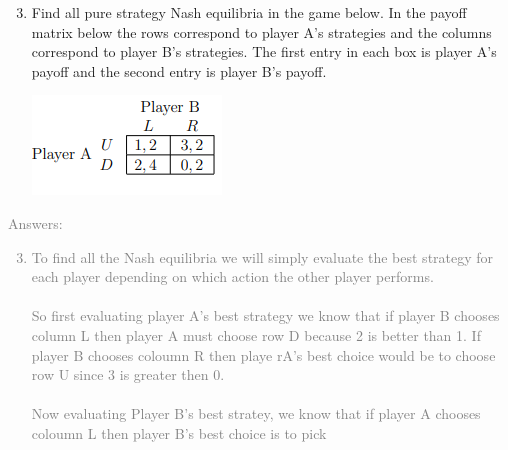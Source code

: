 \documentclass[11pt]{article}
\begin{document}
\begin{enumerate}
	\setcounter{enumi}{2}
	\item Find all pure strategy Nash equilibria in the game below. In the payoff matrix below the rows correspond to player A’s strategies and the columns correspond to player B’s strategies. The first entry in each box is player A’s payoff and the second entry is player B’s payoff.
	\begin{center}
		\includegraphics[scale=1.0]{Figure1.1}
	\end{center}
\end{enumerate}
\textcolor{gray}{
Answers:
\begin{enumerate}
	\setcounter{enumi}{2}
	\item To find all the Nash equilibria we will simply evaluate the best strategy for each player depending on which action the other player performs.\\\\
	So first evaluating player A's best strategy we know that if player B chooses column L then player A must choose row D because 2 is better than 1. If player B chooses coloumn R then playe rA's best choice would be to choose row U since 3 is greater then 0.\\\\
 	Now evaluating Player B's best stratey, we know that if player A chooses coloumn L then player B's best choice is to pick 
\end{enumerate}
}
\end{document}

